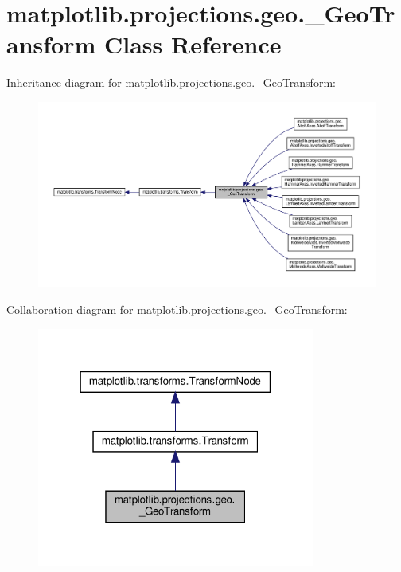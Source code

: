 \hypertarget{classmatplotlib_1_1projections_1_1geo_1_1__GeoTransform}{}\section{matplotlib.\+projections.\+geo.\+\_\+\+Geo\+Transform Class Reference}
\label{classmatplotlib_1_1projections_1_1geo_1_1__GeoTransform}


Inheritance diagram for matplotlib.\+projections.\+geo.\+\_\+\+Geo\+Transform\+:
\nopagebreak
\begin{figure}[H]
\begin{center}
\leavevmode
\includegraphics[width=350pt]{classmatplotlib_1_1projections_1_1geo_1_1__GeoTransform__inherit__graph}
\end{center}
\end{figure}


Collaboration diagram for matplotlib.\+projections.\+geo.\+\_\+\+Geo\+Transform\+:
\nopagebreak
\begin{figure}[H]
\begin{center}
\leavevmode
\includegraphics[width=259pt]{classmatplotlib_1_1projections_1_1geo_1_1__GeoTransform__coll__graph}
\end{center}
\end{figure}
